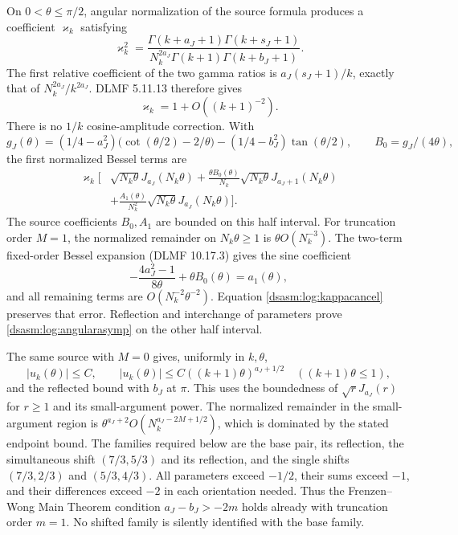 \documentclass[11pt,letterpaper]{article}
\theoremstyle{remark}\newtheorem{remark}[theorem]{Remark}
\begin{document}
On $0<\theta\le\pi/2$, angular normalization of the source formula
produces a coefficient $\varkappa_k$ satisfying
\[
 \varkappa_k^2=
 \frac{\Gamma(k+a_J+1)\Gamma(k+s_J+1)}
      {N_k^{2a_J}\Gamma(k+1)\Gamma(k+b_J+1)}.
\]
The first relative coefficient of the two gamma ratios is
$a_J(s_J+1)/k$, exactly that of $N_k^{2a_J}/k^{2a_J}$.
DLMF 5.11.13 therefore gives
\begin{equation}\label{dsasm:log:kappacancel}
 \varkappa_k=1+O((k+1)^{-2}).
\end{equation}
There is no $1/k$ cosine-amplitude correction.
With
\[
 g_J(\theta)=(1/4-a_J^2)\bigl(\cot(\theta/2)-2/\theta\bigr)
                       -(1/4-b_J^2)\tan(\theta/2),
 \qquad B_0=g_J/(4\theta),
\]
the first normalized Bessel terms are
\begin{align*}
 \varkappa_k\biggl[&\sqrt{N_k\theta}J_{a_J}(N_k\theta)
 +\frac{\theta B_0(\theta)}{N_k}
                     \sqrt{N_k\theta}J_{a_J+1}(N_k\theta)\\
 &+\frac{A_1(\theta)}{N_k^2}
                     \sqrt{N_k\theta}J_{a_J}(N_k\theta)\biggr].
\end{align*}
The source coefficients $B_0,A_1$ are bounded on this half interval.
For truncation order $M=1$, the normalized remainder on
$N_k\theta\ge1$ is $\theta O(N_k^{-3})$. The two-term fixed-order
Bessel expansion (DLMF 10.17.3) gives the sine coefficient
\[
 -\frac{4a_J^2-1}{8\theta}+\theta B_0(\theta)=a_1(\theta),
\]
and all remaining terms are $O(N_k^{-2}\theta^{-2})$.
Equation \eqref{dsasm:log:kappacancel} preserves that error. Reflection and
interchange of parameters prove \eqref{dsasm:log:angularasymp} on the other
half interval.

The same source with $M=0$ gives, uniformly in $k,\theta$,
\begin{equation}\label{dsasm:log:endpointbounds}
 |u_k(\theta)|\le C,\qquad
 |u_k(\theta)|\le C((k+1)\theta)^{a_J+1/2}
       \quad((k+1)\theta\le1),
\end{equation}
and the reflected bound with $b_J$ at $\pi$. This uses the boundedness
of $\sqrt rJ_{a_J}(r)$ for $r\ge1$ and its small-argument power.
The normalized remainder in the small-argument region is
$\theta^{a_J+2}O(N_k^{a_J-2M+1/2})$, which is dominated by the stated
endpoint bound. The families required below are the base pair,
its reflection, the simultaneous shift $(7/3,5/3)$ and its reflection,
and the single shifts $(7/3,2/3)$ and $(5/3,4/3)$.
All parameters exceed $-1/2$, their sums exceed $-1$, and their
differences exceed $-2$ in each orientation needed. Thus the
Frenzen--Wong Main Theorem condition $a_J-b_J>-2m$ holds already
with truncation order $m=1$. No shifted family is silently
identified with the base family.
\end{document}
